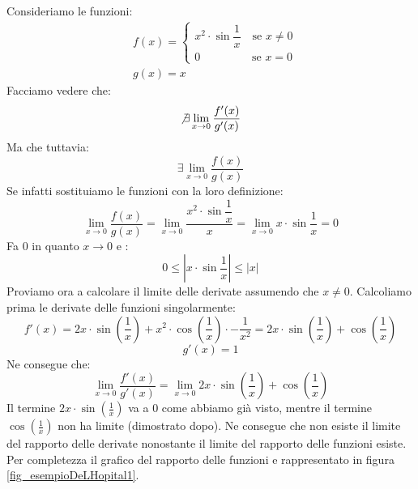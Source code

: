 \begin{itemize}
		Consideriamo le funzioni:
		\begin{align*}
			&f(x) = 
			\begin{cases*}
				x^2 \cdot \sin{\dfrac{1}{x}} \quad \text{se } x \neq 0\\
				0 \qquad \qquad \;\; \text{se } x = 0
			\end{cases*}\\[10pt]
			&g(x) = x
		\end{align*}
		Facciamo vedere che:
		\begin{equation*}
			\not \exists \lim_{x \to 0} \dfrac{f'(x)}{g'(x)}
		\end{equation*}
		Ma che tuttavia:
		\begin{equation*}
			\exists \lim_{x \to 0} \dfrac{f(x)}{g(x)}
		\end{equation*}
		Se infatti sostituiamo le funzioni con la loro definizione:
		\begin{equation*}
			\lim_{x \to 0} \dfrac{f(x)}{g(x)} = \lim_{x \to 0} \dfrac{x^2 \cdot \sin{\dfrac{1}{x}}}{x} = \lim_{x \to 0} x \cdot \sin{\dfrac{1}{x}} = 0
		\end{equation*}
		Fa 0 in quanto $x \to 0$ e :
		\begin{equation*}
			0 \leq \left| x \cdot \sin{\dfrac{1}{x}} \right| \leq |x|
		\end{equation*}
		Proviamo ora a calcolare il limite delle derivate assumendo che $x \neq 0$. Calcoliamo prima le derivate delle funzioni singolarmente:
		\begin{equation*}
			f'(x) = 2x \cdot \sin \left(\dfrac{1}{x} \right) + x^2 \cdot \cos \left(\dfrac{1}{x} \right) \cdot -\dfrac{1}{x^2} = 2x \cdot \sin \left(\dfrac{1}{x} \right) + \cos \left(\dfrac{1}{x} \right) 
		\end{equation*}
		\begin{equation*}
			g'(x) = 1
		\end{equation*}
		Ne consegue che:
		\begin{equation*}
			\lim_{x \to 0} \dfrac{f'(x)}{g'(x)} = \lim_{x \to 0} 2x \cdot \sin \left(\dfrac{1}{x} \right) + \cos \left(\dfrac{1}{x} \right) 
		\end{equation*}
		Il termine $2x \cdot \sin \left(\frac{1}{x} \right)$ va a 0 come abbiamo già visto, mentre il termine $\cos \left(\frac{1}{x} \right)$ non ha limite (dimostrato dopo). Ne consegue che non esiste il limite del rapporto delle derivate nonostante il limite del rapporto delle funzioni esiste. Per completezza il grafico del rapporto delle funzioni e rappresentato in figura \ref{fig_esempioDeLHopital1}.


\end{itemize}
